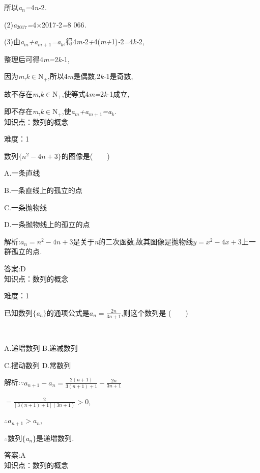\documentclass{article} %
\begin{document}
所以\textit{a${}_{n}$=}4\textit{n-}2\textit{.}

(2)\textit{a}${}_{2017}$\textit{=}4\textit{$\times$}2017\textit{-}2\textit{=}8 066\textit{.}

(3)由\textit{a${}_{m}$+a${}_{m+}$}${}_{1}$\textit{=a${}_{k}$},得4\textit{m-}2\textit{+}4(\textit{m+}1)\textit{-}2\textit{=}4\textit{k-}2,

整理后可得4\textit{m=}2\textit{k-}1,

因为\textit{m},\textit{k}$\mathrm{\in}$N${}_{+}$,所以4\textit{m}是偶数,2\textit{k-}1是奇数,

故不存在\textit{m},\textit{k}$\mathrm{\in}$N${}_{+}$,使等式4\textit{m=}2\textit{k-}1成立,

即不存在\textit{m},\textit{k}$\mathrm{\in}$N${}_{+}$,使\textit{a${}_{m}$+a${}_{m+}$}${}_{1}$\textit{=a${}_{k}$.} \\

知识点：数列的概念

难度：1

 数列$\{n^2-4n+3\}$的图像是(\textit{　　})

 A.一条直线

 B.一条直线上的孤立的点

 C.一条抛物线

 D.一条抛物线上的孤立的点

 解析:$a_n = n^2-4n+3$是关于\textit{n}的二次函数,故其图像是抛物线$y=x^2-4x+3$上一群孤立的点\textit{.}

 答案:D \\

知识点：数列的概念

难度：1

 已知数列$\mathrm{\{}$\textit{a${}_{n}$}$\mathrm{\}}$的通项公式是$a_n = \frac{2n}{3n+1}$,则这个数列是 (\textit{　　})

 \textit{　　　　　　　　　　　　　　　　}

 A.递增数列 B.递减数列

 C.摆动数列 D.常数列

 解析:$\because a_{n+1}-a_n = \frac{2(n+1)}{3(n+1)+1}-\frac{2n}{3n+1}$

$=\frac{2}{[3(n+1)+1](3n+1)}>0$,

$\therefore a_{n+1} > a_n$,

\textit{$\therefore$}数列$\mathrm{\{}$\textit{a${}_{n}$}$\mathrm{\}}$是递增数列\textit{.}

 答案:A \\

知识点：数列的概念
\end{document}
